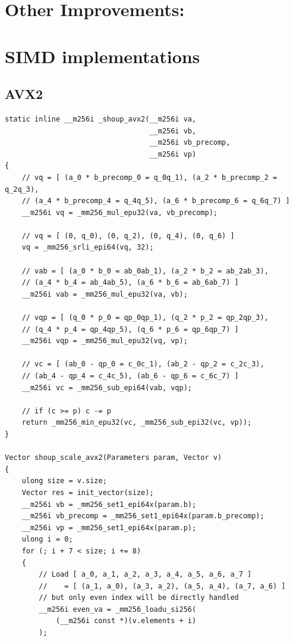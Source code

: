 \documentclass{article}
\begin{document}
\section{Other Improvements:}


\newpage
\section{SIMD implementations}
\label{app:code}


\subsection{AVX2}
\begin{lstlisting}[caption = Auxiliary function of Shoup's modular reduction]
static inline __m256i _shoup_avx2(__m256i va,
                                  __m256i vb,
                                  __m256i vb_precomp,
                                  __m256i vp)
{
    // vq = [ (a_0 * b_precomp_0 = q_0q_1), (a_2 * b_precomp_2 = q_2q_3),
    // (a_4 * b_precomp_4 = q_4q_5), (a_6 * b_precomp_6 = q_6q_7) ]
    __m256i vq = _mm256_mul_epu32(va, vb_precomp);

    // vq = [ (0, q_0), (0, q_2), (0, q_4), (0, q_6) ]
    vq = _mm256_srli_epi64(vq, 32);

    // vab = [ (a_0 * b_0 = ab_0ab_1), (a_2 * b_2 = ab_2ab_3),
    // (a_4 * b_4 = ab_4ab_5), (a_6 * b_6 = ab_6ab_7) ]
    __m256i vab = _mm256_mul_epu32(va, vb);

    // vqp = [ (q_0 * p_0 = qp_0qp_1), (q_2 * p_2 = qp_2qp_3),
    // (q_4 * p_4 = qp_4qp_5), (q_6 * p_6 = qp_6qp_7) ]
    __m256i vqp = _mm256_mul_epu32(vq, vp);

    // vc = [ (ab_0 - qp_0 = c_0c_1), (ab_2 - qp_2 = c_2c_3),
    // (ab_4 - qp_4 = c_4c_5), (ab_6 - qp_6 = c_6c_7) ]
    __m256i vc = _mm256_sub_epi64(vab, vqp);

    // if (c >= p) c -= p
    return _mm256_min_epu32(vc, _mm256_sub_epi32(vc, vp));
}

Vector shoup_scale_avx2(Parameters param, Vector v)
{
    ulong size = v.size;
    Vector res = init_vector(size);
    __m256i vb = _mm256_set1_epi64x(param.b);
    __m256i vb_precomp = _mm256_set1_epi64x(param.b_precomp);
    __m256i vp = _mm256_set1_epi64x(param.p);
    ulong i = 0;
    for (; i + 7 < size; i += 8)
    {
        // Load [ a_0, a_1, a_2, a_3, a_4, a_5, a_6, a_7 ]
        //    = [ (a_1, a_0), (a_3, a_2), (a_5, a_4), (a_7, a_6) ]
        // but only even index will be directly handled
        __m256i even_va = _mm256_loadu_si256(
            (__m256i const *)(v.elements + i)
        );


\end{lstlisting}
\end{document}
